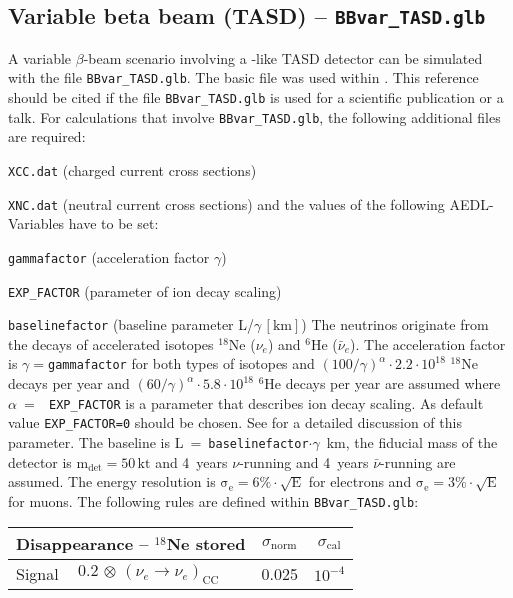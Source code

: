 \begin{appendix}
\subsection*{Variable beta beam (TASD) -- {\tt BBvar\_TASD.glb}}

A variable $\beta$-beam scenario involving a \NOVA-like TASD detector can be simulated with the file 
{\tt BBvar\_TASD.glb}. The basic file was used within \cite{Huber:2005jk}. This reference
should be cited if the file {\tt BBvar\_TASD.glb} is used for a scientific publication or a talk. For calculations that
involve {\tt BBvar\_TASD.glb}, the following additional files are required:
\bi
\item {\tt XCC.dat} (charged current cross sections)
\item {\tt XNC.dat} (neutral current cross sections)
\ei
and the values of the following {\sf AEDL}-Variables have to be set:
\bi
\item {\tt gammafactor} (acceleration factor $\gamma$)
\item {\tt EXP\_FACTOR} (parameter of ion decay scaling)
\item {\tt baselinefactor} (baseline parameter L/$\gamma\,\left[\mathrm{km}\right]$)
\ei
The neutrinos originate from the decays of accelerated isotopes $^{18}$Ne ($\nu_e$) and $^6$He ($\bar{\nu}_e$).
The acceleration factor is $\gamma=${\tt gammafactor} for both types of isotopes and
$(100/\gamma)^\alpha\cdot2.2\cdot10^{18}$ $^{18}$Ne decays per
year and $(60/\gamma)^\alpha\cdot5.8\cdot10^{18}$ $^{6}$He decays per year are assumed where $\alpha$~=~{\tt
EXP\_FACTOR} is a parameter that describes ion decay scaling. As default value {\tt EXP\_FACTOR=0} should be chosen.
See \cite{Huber:2005jk} for a detailed discussion of this parameter. The baseline is L~=~{\tt baselinefactor}$\cdot\gamma$~km, the
fiducial mass of the detector is $\mathrm{m_{det} = 50 \,kt}$ and 4~years $\nu$-running and 4~years
$\bar{\nu}$-running are assumed. The energy resolution is $\mathrm{\sigma_e=6 \% \cdot \sqrt{E}}$ for electrons and  $\mathrm{\sigma_e=3 \% \cdot \sqrt{E}}$
for muons.  The following rules are defined within {\tt BBvar\_TASD.glb}:
\begin{center}
\begin{tabular}{|l|ll|c|c|}
\hline \hline
\multicolumn{3}{|l|}{Disappearance -- $^{18}$Ne stored} & $\sigma_\mathrm{norm}$ & $\sigma_\mathrm{cal}$ \\ \hline
Signal & $0.2 \, \otimes \, (\nu_e\rightarrow\nu_e)_{\mathrm{CC}}$ & \hspace{6cm} & 0.025 & $10^{-4}$ \\

\end{tabular}
\end{center}
\end{appendix}
